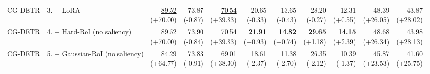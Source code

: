 \documentclass{article}
\begin{document}
{\begin{tabular}{llrrrrrrrrr}
CG-DETR & 3. + LoRA & \shortstack{\underline{89.52} \\ {\scriptsize (+70.00)}} & \shortstack{73.87 \\ {\scriptsize (-0.87)}} & \shortstack{\underline{70.54} \\ {\scriptsize (+39.83)}} & \shortstack{20.65 \\ {\scriptsize (-0.33)}} & \shortstack{13.65 \\ {\scriptsize (-0.43)}} & \shortstack{28.20 \\ {\scriptsize (-0.27)}} & \shortstack{12.31 \\ {\scriptsize (+0.55)}} & \shortstack{48.39 \\ {\scriptsize (+26.05)}} & \shortstack{43.87 \\ {\scriptsize (+28.02)}} \\
CG-DETR & 4. + Hard-RoI (no saliency) & \shortstack{\underline{89.52} \\ {\scriptsize (+70.00)}} & \shortstack{\underline{73.90} \\ {\scriptsize (-0.84)}} & \shortstack{\underline{70.54} \\ {\scriptsize (+39.83)}} & \shortstack{\textbf{21.91} \\ {\scriptsize (+0.93)}} & \shortstack{\textbf{14.82} \\ {\scriptsize (+0.74)}} & \shortstack{\textbf{29.65} \\ {\scriptsize (+1.18)}} & \shortstack{\textbf{14.15} \\ {\scriptsize (+2.39)}} & \shortstack{\underline{48.68} \\ {\scriptsize (+26.34)}} & \shortstack{\underline{43.98} \\ {\scriptsize (+28.13)}} \\
CG-DETR & 5. + Gaussian-RoI (no saliency) & \shortstack{84.29 \\ {\scriptsize (+64.77)}} & \shortstack{73.83 \\ {\scriptsize (-0.91)}} & \shortstack{69.01 \\ {\scriptsize (+38.30)}} & \shortstack{18.61 \\ {\scriptsize (-2.37)}} & \shortstack{11.38 \\ {\scriptsize (-2.70)}} & \shortstack{26.35 \\ {\scriptsize (-2.12)}} & \shortstack{10.39 \\ {\scriptsize (-1.37)}} & \shortstack{45.87 \\ {\scriptsize (+23.53)}} & \shortstack{41.60 \\ {\scriptsize (+25.75)}} \\

\end{tabular}}
\end{document}
